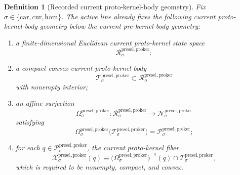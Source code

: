 \documentclass[11pt]{article}
\newcommand{\Car}{\mathrm{car}}
\newcommand{\Cur}{\mathrm{cur}}
\newcommand{\Hom}{\mathrm{hom}}
\newcommand{\PreKernelSpace}[1]{\mathcal N_{#1}^{\mathrm{presel,preker}}}
\newcommand{\PreKernelBody}[1]{\mathcal P_{#1}^{\mathrm{presel,preker}}}
\newcommand{\ProtoKernelSpace}[1]{\mathcal R_{#1}^{\mathrm{presel,proker}}}
\newcommand{\ProtoKernelBody}[1]{\mathcal T_{#1}^{\mathrm{presel,proker}}}
\newcommand{\ProtoKernelProj}[1]{\Omega_{#1}^{\mathrm{presel,proker}}}
\newcommand{\ProtoKernelFiber}[2]{\mathcal X_{#1}^{\mathrm{presel,proker}}(#2)}
\newtheorem{definition}{Definition}
\begin{document}
\begin{definition}[Recorded current proto-kernel-body geometry]
\label{def:protokernelgeometry}
Fix \(\sigma\in\{\Car,\Cur,\Hom\}\). The active line already fixes the following current proto-kernel-body geometry below the current pre-kernel-body geometry:
\begin{enumerate}
    \item a finite-dimensional Euclidean current proto-kernel state space
    \[
    \ProtoKernelSpace{\sigma};
    \]
    \item a compact convex current proto-kernel body
    \[
    \ProtoKernelBody{\sigma}\subset\ProtoKernelSpace{\sigma}
    \]
    with nonempty interior;
    \item an affine surjection
    \[
    \ProtoKernelProj{\sigma}:\ProtoKernelSpace{\sigma}\to\PreKernelSpace{\sigma}
    \]
    satisfying
    \[
    \ProtoKernelProj{\sigma}\bigl(\ProtoKernelBody{\sigma}\bigr)
    =
    \PreKernelBody{\sigma};
    \]
    \item for each \(q\in\PreKernelBody{\sigma}\), the current proto-kernel fiber
    \[
    \ProtoKernelFiber{\sigma}{q}
    \equiv
    \bigl(\ProtoKernelProj{\sigma}\bigr)^{-1}(q)\cap\ProtoKernelBody{\sigma},
    \]
    which is required to be nonempty, compact, and convex.
\end{enumerate}
\end{definition}
\end{document}
